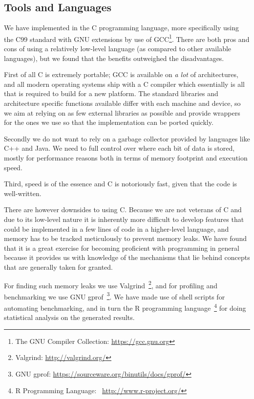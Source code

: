 \subsection{Tools and Languages}

We have implemented \thename{} in the C programming language, more specifically
using the C99 standard with GNU extensions by use of GCC\footnote{The GNU
  Compiler Collection: \url{https://gcc.gnu.org}}. There are both pros and cons
of using a relatively low-level language (as compared to other available
languages), but we found that the benefits outweighed the disadvantages.

First of all C is extremely portable; GCC is available on \textit{a lot} of
architectures, and all modern operating systems ship with a C compiler which
essentially is all that is required to build \thename{} for a new platform. The
standard libraries and architecture specific functions available differ with
each machine and device, so we aim at relying on as few external libraries as
possible and provide wrappers for the ones we use so that the implementation can
be ported quickly.

Secondly we do not want to rely on a garbage collector provided by languages
like C++ and Java. We need to full control over where each bit of data is
stored, mostly for performance reasons both in terms of memory footprint and
execution speed.

Third, speed is of the essence and C is notoriously fast, given that the code is
well-written.

There are however downsides to using C. Because we are not veterans of C and due
to its low-level nature it is inherently more difficult to develop features that
could be implemented in a few lines of code in a higher-level language, and
memory has to be tracked meticulously to prevent memory leaks. We have found
that it is a great exercise for becoming proficient with programming in general
because it provides us with knowledge of the mechanisms that lie behind concepts
that are generally taken for granted.

For finding such memory leaks we use Valgrind~\footnote{Valgrind:
  \url{http://valgrind.org/}}, and for profiling and benchmarking we use GNU
gprof~\footnote{GNU gprof:
  \url{https://sourceware.org/binutils/docs/gprof/}}. We have made use of shell
scripts for automating benchmarking, and in turn the R programming
language~\footnote{R Programming Language: ~\url{http://www.r-project.org/}} for
doing statistical analysis on the generated results.

